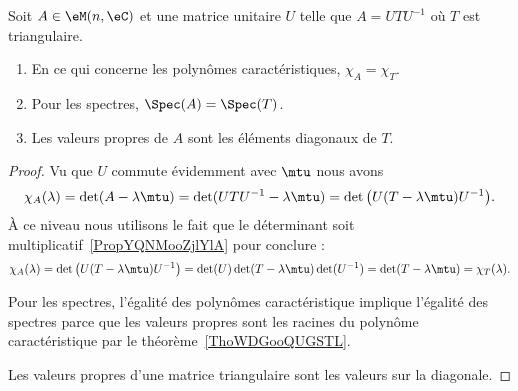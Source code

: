 \begin{lemma}       \label{LEMooRCFGooPPXiKi}
    Soit \( A\in \eM(n,\eC)\) et une matrice unitaire \( U\) telle que \( A=UTU^{-1}\) où \( T\) est triangulaire.
    \begin{enumerate}
        \item
            En ce qui concerne les polynômes caractéristiques, \( \chi_A=\chi_T\).
        \item
            Pour les spectres, \( \Spec(A)=\Spec(T)\).
        \item
            Les valeurs propres de \( A\) sont les éléments diagonaux de \( T\).
    \end{enumerate}
\end{lemma}

\begin{proof}
    Vu que \( U\) commute évidemment avec \( \mtu\) nous avons
    \begin{equation}
        \chi_A(\lambda)=\det(A-\lambda \mtu)=\det(UTU^{-1}-\lambda\mtu)=\det\big( U(T-\lambda\mtu)U^{-1} \big).
    \end{equation}
    À ce niveau nous utilisons le fait que le déterminant soit multiplicatif~\ref{PropYQNMooZjlYlA} pour conclure :
    \begin{equation}
        \chi_A(\lambda)=\det\big( U(T-\lambda\mtu)U^{-1} \big)=\det(U)\det(T-\lambda\mtu)\det(U^{-1})=\det(T-\lambda\mtu)=\chi_T(\lambda).
    \end{equation}

    Pour les spectres, l'égalité des polynômes caractéristique implique l'égalité des spectres parce que les valeurs propres sont les racines du polynôme caractéristique par le théorème~\ref{ThoWDGooQUGSTL}.

    Les valeurs propres d'une matrice triangulaire sont les valeurs sur la diagonale.
\end{proof}

